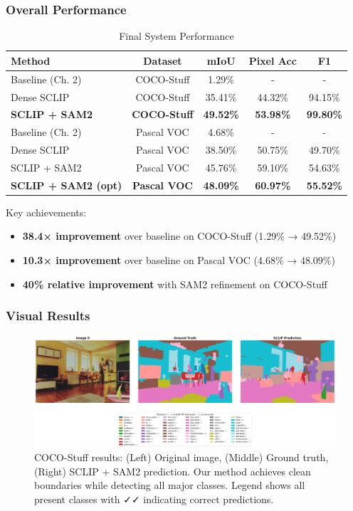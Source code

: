 \subsubsection{Overall Performance}

\begin{table}[h]
\centering
\caption{Final System Performance}
\label{tab:sclip_final_results}
\begin{tabular}{lcccc}
\hline
\textbf{Method} & \textbf{Dataset} & \textbf{mIoU} & \textbf{Pixel Acc} & \textbf{F1} \\
\hline
Baseline (Ch. 2) & COCO-Stuff & 1.29\% & - & - \\
Dense SCLIP & COCO-Stuff & 35.41\% & 44.32\% & 94.15\% \\
\textbf{SCLIP + SAM2} & \textbf{COCO-Stuff} & \textbf{49.52\%} & \textbf{53.98\%} & \textbf{99.80\%} \\
\hline
Baseline (Ch. 2) & Pascal VOC & 4.68\% & - & - \\
Dense SCLIP & Pascal VOC & 38.50\% & 50.75\% & 49.70\% \\
SCLIP + SAM2 & Pascal VOC & 45.76\% & 59.10\% & 54.63\% \\
\textbf{SCLIP + SAM2 (opt)} & \textbf{Pascal VOC} & \textbf{48.09\%} & \textbf{60.97\%} & \textbf{55.52\%} \\
\hline
\end{tabular}
\end{table}

Key achievements:
\begin{itemize}
    \item \textbf{38.4× improvement} over baseline on COCO-Stuff (1.29\% → 49.52\%)
    \item \textbf{10.3× improvement} over baseline on Pascal VOC (4.68\% → 48.09\%)
    \item \textbf{40\% relative improvement} with SAM2 refinement on COCO-Stuff
\end{itemize}

\subsubsection{Visual Results}

\begin{figure}[h]
\centering
\includegraphics[width=\textwidth]{Imagenes/sclip_coco_sample0.png}
\caption{COCO-Stuff results: (Left) Original image, (Middle) Ground truth, (Right) SCLIP + SAM2 prediction. Our method achieves clean boundaries while detecting all major classes. Legend shows all present classes with ✓✓ indicating correct predictions.}
\label{fig:sclip_coco_results}
\end{figure}

